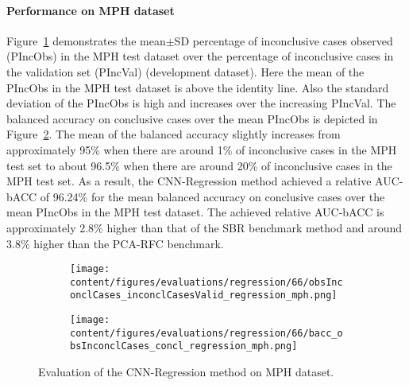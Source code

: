 
\paragraph{Performance on MPH dataset}

Figure~\ref{fig:obsInconclCases_inconclCasesValid_regression_mph} demonstrates
the mean$\pm$SD percentage of inconclusive cases observed (PIncObs) in the MPH test dataset 
over the percentage of inconclusive cases in the validation set (PIncVal) (development dataset).
Here the mean of the PIncObs in the MPH test dataset is above the identity line.
Also the standard deviation of the PIncObs is high and increases over the increasing PIncVal.
The balanced accuracy on conclusive cases over the mean PIncObs 
is depicted in Figure~\ref{fig:bacc_obsInconclCases_concl_regression_mph}.
The mean of the balanced accuracy slightly increases from approximately 95\% 
when there are around 1\% of inconclusive cases in the MPH test set to about 96.5\% 
when there are around 20\% of inconclusive cases in the MPH test set.
As a result, the CNN-Regression method achieved a relative AUC-bACC of 96.24\% for the mean balanced accuracy on conclusive cases 
over the mean PIncObs in the MPH test dataset.
The achieved relative AUC-bACC is approximately 2.8\% higher than that of the SBR benchmark method 
and around 3.8\% higher than the PCA-RFC benchmark.


\begin{figure}[ht]
  \begin{subfigure}{0.49\textwidth}
    \centering
    \texttt{[image: content/figures/evaluations/regression/66/obsInconclCases\_inconclCasesValid\_regression\_mph.png]}
    \label{fig:obsInconclCases_inconclCasesValid_regression_mph}
  \end{subfigure}
  \hfill
  \begin{subfigure}{0.49\textwidth}
    \centering
    \texttt{[image: content/figures/evaluations/regression/66/bacc\_obsInconclCases\_concl\_regression\_mph.png]}
    \label{fig:bacc_obsInconclCases_concl_regression_mph}
  \end{subfigure}
  \caption{Evaluation of the CNN-Regression method on MPH dataset.}
  \label{fig:perf_regression_mph}
\end{figure}


